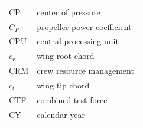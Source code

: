 \documentclass[
]{book}
\begin{document}
\begin{longtable}[]{@{}ll@{}}
\begin{minipage}[t]{0.47\columnwidth}
CP\strut
\end{minipage} & \begin{minipage}[t]{0.47\columnwidth}\raggedright
center of pressure\strut
\end{minipage}\tabularnewline
\begin{minipage}[t]{0.47\columnwidth}\raggedright
\(C_P\)\strut
\end{minipage} & \begin{minipage}[t]{0.47\columnwidth}\raggedright
propeller power coefficient\strut
\end{minipage}\tabularnewline
\begin{minipage}[t]{0.47\columnwidth}\raggedright
CPU\strut
\end{minipage} & \begin{minipage}[t]{0.47\columnwidth}\raggedright
central processing unit\strut
\end{minipage}\tabularnewline
\begin{minipage}[t]{0.47\columnwidth}\raggedright
\(c_r\)\strut
\end{minipage} & \begin{minipage}[t]{0.47\columnwidth}\raggedright
wing root chord\strut
\end{minipage}\tabularnewline
\begin{minipage}[t]{0.47\columnwidth}\raggedright
CRM\strut
\end{minipage} & \begin{minipage}[t]{0.47\columnwidth}\raggedright
crew resource management\strut
\end{minipage}\tabularnewline
\begin{minipage}[t]{0.47\columnwidth}\raggedright
\(c_t\)\strut
\end{minipage} & \begin{minipage}[t]{0.47\columnwidth}\raggedright
wing tip chord\strut
\end{minipage}\tabularnewline
\begin{minipage}[t]{0.47\columnwidth}\raggedright
CTF\strut
\end{minipage} & \begin{minipage}[t]{0.47\columnwidth}\raggedright
combined test force\strut
\end{minipage}\tabularnewline
\begin{minipage}[t]{0.47\columnwidth}\raggedright
CY\strut
\end{minipage} & \begin{minipage}[t]{0.47\columnwidth}\raggedright
calendar year\strut
\end{minipage}\tabularnewline

\end{longtable}
\end{document}
